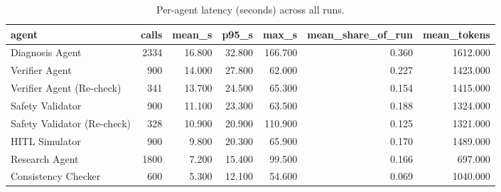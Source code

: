 \begin{table}[t]
\centering
\small
\begin{tabular}{lrrrrrr}
\toprule
agent & calls & mean\_s & p95\_s & max\_s & mean\_share\_of\_run & mean\_tokens \\
\midrule
Diagnosis Agent & 2334 & 16.800 & 32.800 & 166.700 & 0.360 & 1612.000 \\
Verifier Agent & 900 & 14.000 & 27.800 & 62.000 & 0.227 & 1423.000 \\
Verifier Agent (Re-check) & 341 & 13.700 & 24.500 & 65.300 & 0.154 & 1415.000 \\
Safety Validator & 900 & 11.100 & 23.300 & 63.500 & 0.188 & 1324.000 \\
Safety Validator (Re-check) & 328 & 10.900 & 20.900 & 110.900 & 0.125 & 1321.000 \\
HITL Simulator & 900 & 9.800 & 20.300 & 65.900 & 0.170 & 1489.000 \\
Research Agent & 1800 & 7.200 & 15.400 & 99.500 & 0.166 & 697.000 \\
Consistency Checker & 600 & 5.300 & 12.100 & 54.600 & 0.069 & 1040.000 \\
\bottomrule
\end{tabular}
\caption{Per-agent latency (seconds) across all runs.}
\label{tab:rigor_latency}
\end{table}
